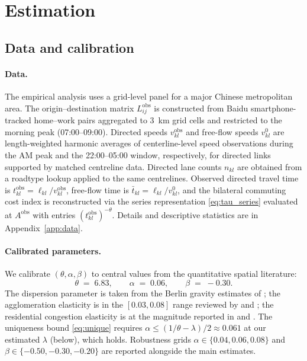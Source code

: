 \documentclass[12pt]{article}
\newcommand{\tbar}{\bar t}
\newcommand{\tkl}{t_{kl}}
\newcommand{\obs}{\mathrm{obs}}
\begin{document}
\section{Estimation}\label{sec:est}

\subsection{Data and calibration}\label{ssec:data}

\paragraph{Data.}
The empirical analysis uses a grid-level panel for a major Chinese
metropolitan area.  The origin--destination matrix $L_{ij}^{\obs}$ is
constructed from Baidu smartphone-tracked home--work pairs aggregated
to 3~km grid cells and restricted to the morning peak
(07:00--09:00).  Directed speeds $v_{kl}^{\obs}$ and free-flow
speeds $v^{0}_{kl}$ are length-weighted harmonic averages of
centerline-level speed observations during the AM peak and the
22:00--05:00 window, respectively, for directed links supported by
matched centreline data.  Directed lane counts $n_{kl}$ are obtained
from a roadtype lookup applied to the same centrelines.  Observed
directed travel time is $\tkl^{\obs}=\ell_{kl}/v_{kl}^{\obs}$, free-flow
time is $\tbar_{kl}=\ell_{kl}/v^{0}_{kl}$, and the bilateral commuting
cost index is reconstructed via the series representation
\eqref{eq:tau_series} evaluated at $A^{\obs}$ with entries
$(\tkl^{\obs})^{-\theta}$.  Details and descriptive statistics are in
Appendix~\ref{app:data}.

\paragraph{Calibrated parameters.}
We calibrate $(\theta,\alpha,\beta)$ to central values from the
quantitative spatial literature:
\begin{equation}
  \theta\;=\;6.83,\qquad
  \alpha\;=\;0.06,\qquad
  \beta\;=\;-0.30.
  \label{eq:calib}
\end{equation}
The dispersion parameter is taken from the Berlin gravity estimates
of \citet{Ahlfeldt2015}; the agglomeration elasticity is in the
$[0.03,0.08]$ range reviewed by \citet{CombesGobillon2015} and
\citet{RosenthalStrange2004}; the residential congestion elasticity
is at the magnitude reported in \citet{MonteReddingRossiHansberg2018}
and \citet{HeblichReddingSturm2020}.  The uniqueness bound
\eqref{eq:unique} requires $\alpha\le(1/\theta-\lambda)/2\approx
0.061$ at our estimated $\lambda$ (below), which holds.  Robustness
grids $\alpha\in\{0.04,0.06,0.08\}$ and
$\beta\in\{-0.50,-0.30,-0.20\}$ are reported alongside the main
estimates.
\end{document}
